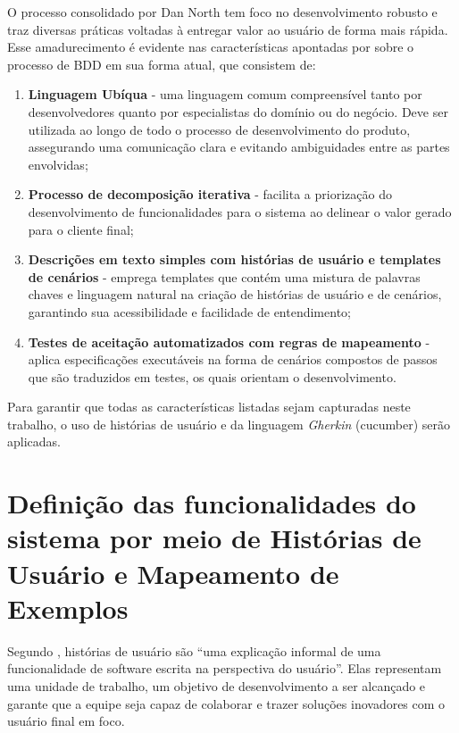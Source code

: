 O processo consolidado por Dan North tem foco no desenvolvimento robusto e traz diversas práticas voltadas à entregar valor ao usuário de forma mais rápida. Esse 
amadurecimento é evidente nas características apontadas por  sobre o processo de BDD em sua forma atual, que consistem de:

\begin{enumerate}
	\item \textbf{Linguagem Ubíqua} - uma linguagem comum compreensível tanto por desenvolvedores quanto por especialistas do domínio ou do negócio. Deve ser utilizada 
	ao longo de todo o processo de desenvolvimento do produto, assegurando uma comunicação clara e evitando ambiguidades entre as partes envolvidas;
	\item \textbf{Processo de decomposição iterativa} - facilita a priorização do desenvolvimento de funcionalidades para o sistema ao delinear o valor gerado para o cliente final;
	\item \textbf{Descrições em texto simples com histórias de usuário e templates de cenários} - emprega templates que contém uma mistura de palavras chaves e linguagem natural na 
	criação de histórias de usuário e de cenários, garantindo sua acessibilidade e facilidade de entendimento;
	\item \textbf{Testes de aceitação automatizados com regras de mapeamento} - aplica especificações executáveis na forma de cenários compostos de passos que são traduzidos em testes, 
	os quais orientam o desenvolvimento.
\end{enumerate}

Para garantir que todas as características listadas sejam capturadas neste trabalho, o uso de histórias de usuário \cite{atlassianUserStories} e da 
linguagem \textit{Gherkin} (cucumber) \cite{cucumberHistory} serão aplicadas.


\section{\textbf{Definição das funcionalidades do sistema por meio de Histórias de Usuário e Mapeamento de Exemplos}}

Segundo , histórias de usuário são “uma explicação informal de uma funcionalidade de software escrita na perspectiva do usuário”. Elas 
representam uma unidade de trabalho, um objetivo de desenvolvimento a ser alcançado e garante que a equipe seja capaz de colaborar e trazer soluções inovadores 
com o usuário final em foco.

